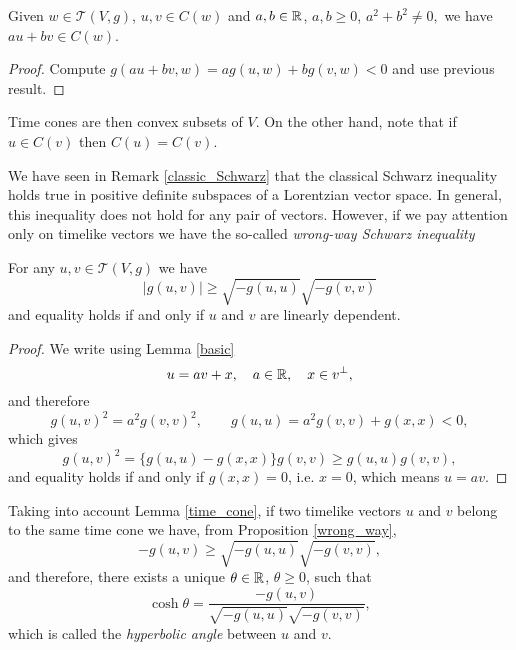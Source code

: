 \begin{corollary}\label{convexity}
Given $w\in\mathcal{T}(V,g)$, $u,v\in C(w)$ and $a,b\in \mathbb{R}$, $a,b\geq 0$, $a^2+b^2 \neq 0,$ we have $au+bv\in C(w)$.
\end{corollary}

\begin{proof}
    Compute $g(au+bv,w)=a g(u,w)+ b g(v,w)<0$ and use previous result.
\end{proof}

\begin{remark}
    Time cones are then convex subsets of $V$. On the other hand, note that if $u\in C(v)$ then $C(u)=C(v)$.
\end{remark}

We have seen in Remark \ref{classic_Schwarz} that the classical Schwarz inequality holds true in positive definite subspaces of a Lorentzian vector space. In general, this inequality does not hold for any pair of vectors. However, if we pay attention only on timelike vectors we have the so-called \emph{wrong-way Schwarz inequality} \cite[Prop. 5.30]{oneill83}

\begin{proposition}\label{wrong_way}
    For any $u,v \in \mathcal{T}(V,g)$ we have
    \[
        \mid g(u,v) \mid \geq \sqrt{-g(u,u)}\sqrt{-g(v,v)}
    \]
    and equality holds if and only if $u$ and $v$ are linearly dependent.
\end{proposition}

\begin{proof}
    We write using Lemma \ref{basic}
    \[
        u=av+x, \quad a\in \mathbb{R}, \quad x\in v^{\perp},
    \]
    and therefore
    \[
        g(u,v)^2=a^2g(v,v)^2, \quad \quad g(u,u)=a^2g(v,v)+g(x,x)<0,
    \]
    which gives
    \[
        g(u,v)^2=\{g(u,u)-g(x,x)\}g(v,v) \geq g(u,u)g(v,v),
    \]
    and equality holds if and only if $g(x,x)=0$, i.e. $x=0$, which means $u=av$.
\end{proof}

Taking into account Lemma \ref{time_cone}, if two timelike vectors $u$ and $v$ belong to the same time cone we have, from Proposition \ref{wrong_way},
\[
    -g(u,v) \geq \sqrt{-g(u,u)}\sqrt{-g(v,v)},
\]
and therefore, there exists a unique $\theta \in \mathbb{R}$, $\theta \geq 0$, such that
\[
    \cosh \theta =\frac{-g(u,v)}{\sqrt{-g(u,u)}\sqrt{-g(v,v)}},
\]
which is called the \emph{hyperbolic angle} between $u$ and $v$.

\vspace{2mm}


